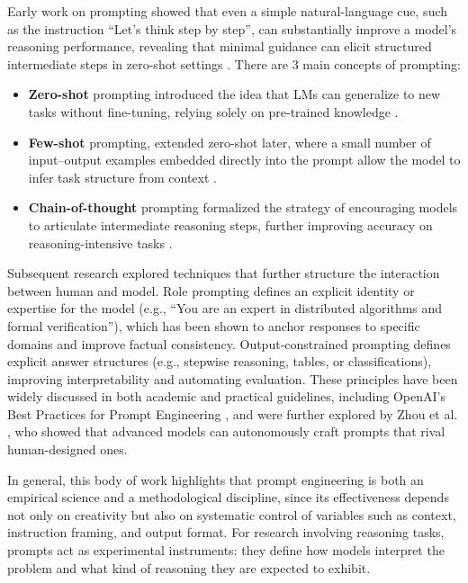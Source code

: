 Early work on prompting showed that even a simple natural-language cue, such as the instruction “Let’s think step by step”, can substantially improve a model’s reasoning performance, revealing that minimal guidance can elicit structured intermediate steps in zero-shot settings \cite{kojima2022zeroshot}. There are 3 main concepts of prompting:
\begin{itemize}
    \item \textbf{Zero-shot} prompting introduced the idea that LMs can generalize to new tasks without fine-tuning, relying solely on pre-trained knowledge \cite{kojima2022zeroshot}.
    \item \textbf{Few-shot} prompting, extended zero-shot later, where a small number of input–output examples embedded directly into the prompt allow the model to infer task structure from context \cite{liu2023pretrainpromptpredict}. 
    \item \textbf{Chain-of-thought} prompting formalized the strategy of encouraging models to articulate intermediate reasoning steps, further improving accuracy on reasoning-intensive tasks \cite{wei2022cot}.
\end{itemize}
Subsequent research explored techniques that further structure the interaction between human and model. Role prompting defines an explicit identity or expertise for the model (e.g., “You are an expert in distributed algorithms and formal verification”), which has been shown to anchor responses to specific domains and improve factual consistency. Output-constrained prompting defines explicit answer structures (e.g., stepwise reasoning, tables, or classifications), improving interpretability and automating evaluation. These principles have been widely discussed in both academic and practical guidelines, including OpenAI’s Best Practices for Prompt Engineering \cite{openai2024promptguide}, and were further explored by Zhou et al. \cite{zhou2023humanprompt}, who showed that advanced models can autonomously craft prompts that rival human-designed ones.

In general, this body of work highlights that prompt engineering is both an empirical science and a methodological discipline, since its effectiveness depends not only on creativity but also on systematic control of variables such as context, instruction framing, and output format. For research involving reasoning tasks, prompts act as experimental instruments: they define how models interpret the problem and what kind of reasoning they are expected to exhibit.

